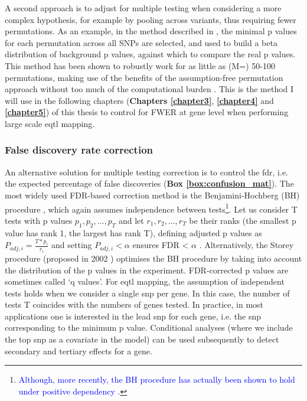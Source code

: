 A second approach is to adjust for multiple testing when considering a more complex hypothesis, for example by pooling across variants, thus requiring fewer permutations.
As an example, in the method described in \cite{ongen2016fast}, the minimal p values for each permutation across all SNPs are selected, and used to build a beta distribution of background p values, against which to compare the real p values.
This method has been shown to robustly work for as little as (M=) 50-100 permutations, making use of the benefits of the assumption-free permutation approach without too much of the computational burden \cite{ongen2016fast}. 
This is the method I will use in the following chapters (\textbf{Chapters \ref{chapter3}}, \textbf{\ref{chapter4}} and \textbf{\ref{chapter5}}) of this thesis to control for FWER at gene level when performing large scale \gls{eqtl} mapping.

\subsubsection{False discovery rate correction}

An alternative solution for multiple testing correction is to control the \gls{fdr}, i.e. the expected percentage of false discoveries (\textbf{Box \ref{box:confusion_mat}}).
The most widely used FDR-based correction method is the Benjamini-Hochberg (BH) procedure \cite{benjamini1995controlling}, which again assumes independence between tests\footnote{\textcolor{blue}{Although, more recently, the BH procedure has actually been shown to hold under positive dependency \cite{benjamini2001control}.}}. 
Let us consider T tests with p values $p_1, p_2, ..., p_T$ and let $r_1, r_2, ..., r_T$ be their ranks (the smallest p value has rank 1, the largest has rank T), defining adjusted p values as $P_{adj,i} = \frac{T*p_i}{r_i} $ and setting $P_{adj,i} <\alpha$ ensures FDR < $\alpha$ \cite{yekutieli1999resampling}.
Alternatively, the Storey procedure (proposed in 2002 \cite{storey2002direct, storey2003statistical}) optimises the BH procedure by taking into account the distribution of the p values in the experiment.
FDR-corrected p values 
are sometimes called `q values'.
For \gls{eqtl} mapping, the assumption of independent tests holds when we consider a single \gls{snp} per gene.
In this case, the number of tests T coincides with the numbers of genes tested.
In practice, in most applications one is interested in the lead \gls{snp} for each gene, i.e. the \gls{snp} corresponding to the minimum p value.
Conditional analyses (where we include the top \gls{snp} as a covariate in the model) can be used subsequently to detect secondary and tertiary effects for a gene.

